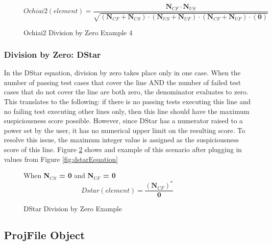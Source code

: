 \begin{figure}[!htb]
	\begin{center}
		\begin{equation}
			Ochiai2(element) = \frac{\textbf{N$_{CF}$}\cdot{\textbf{N$_{US}$}}}{\sqrt{(\textbf{N$_{CF}$}  + \textbf{N$_{CS}$}) \cdot (\textbf{N$_{US}$}  + \textbf{N$_{UF}$}) \cdot (\textbf{N$_{CF}$}  + \textbf{N$_{UF}$}) \cdot (\textbf{0})}}
		\end{equation}
		\caption{\label{fig:ochiai2_div_by_zero_4} Ochiai2 Division by Zero
		Example 4}
	\end{center}
\end{figure}

\subsubsection{Division by Zero: DStar}
\label{subsubsec:div_by_zero_dstar}

In the DStar equation, division by zero takes place only in one case. When the
number of passing test cases that cover the line AND the number of failed test
cases that do not cover the line are both zero, the denominator evaluates to
zero. This translates to the following: if there is no passing tests executing
this line and no failing test executing other lines only, then this line should
have the maximum suspiciousness score possible. However, since DStar has a
numerator raised to a power set by the user, it has no numerical upper limit on
the resulting score. To resolve this issue, the maximum integer value is
assigned as the suspiciousness score of this line.
Figure \ref{fig:dstar_div_by_zero} shows and example of this scenario after
plugging in values from Figure \ref{fig:dstarEquation}

\begin{figure}[!htb]
	\begin{center}
        When \textbf{N$_{CS}$ = 0} and \textbf{N$_{UF}$ = 0 }
		\begin{equation}
			Dstar(element) = \frac{(\textbf{N$_{CF}$})^{\ast}}{\textbf{0}}
		\end{equation}
		\caption{\label{fig:dstar_div_by_zero} DStar Division by Zero Example}
	\end{center}
\end{figure}

\subsection{ProjFile Object}
\label{subsec:projfile_obj}

